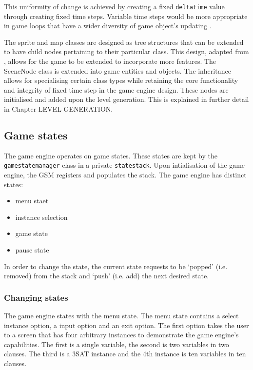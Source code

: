 \documentclass[11pt, a4paper, oneside]{report} %
\begin{document}
This uniformity of change is achieved by creating a fixed
\texttt{delta\textunderscore time} value through creating fixed time steps.
Variable time steps would be more appropriate in game loops that have a wider
diversity of game object's updating \cite{Gregory:2009}.

The sprite and map classes are designed as tree structures that can be extended
to have child nodes pertaining to their particular class. This design, adapted
from \cite{Haller:2013:SGD:2556030}, allows for the game to be extended to
incorporate more features. The SceneNode class is extended into game entities
and objects. The inheritance allows for specialising certain class types while
retaining the core functionality and integrity of fixed time step in the game
engine design. These nodes are initialised and added upon the level
generation. This is explained in further detail in Chapter LEVEL GENERATION.


\subsection{Game states}

The game engine operates on game states. These states are kept by the
\texttt{game\textunderscore state\textunderscore manager} class in a private
\texttt{state\textunderscore stack\textunderscore}. Upon intialisation of the
game engine, the GSM registers and populates the stack. The game engine has distinct states:

\begin{itemize}
\item menu staet
\item instance selection
\item game state
\item pause state
\end{itemize}

In order to change the state, the current state requests to be `popped' (i.e.
removed) from the stack and `push' (i.e. add) the next desired state.

\subsubsection{Changing states}

The game engine states with the menu state. The menu state contains a select
instance option, a input option and an exit option. The first option takes the
user to a screen that has four arbitrary instances to demonstrate the game
engine's capabilities. The first is a single variable, the second is two
variables in two clauses. The third is a 3SAT instance and the 4th instance is
ten variables in ten clauses.
\end{document}
